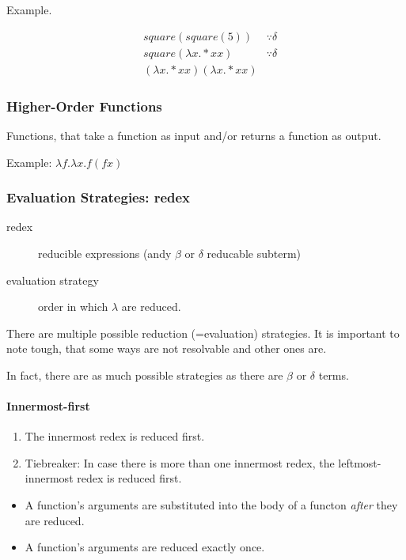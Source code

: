 Example. 

\begin{align*}
&square(square(5)) & \because \delta \\
&square(\lambda x. * x x) & \because \delta \\
& (\lambda x. * x x)(\lambda x. * x x) & 
\end{align*}

\subsubsection{Higher-Order Functions}

Functions, that take a function as input and/or returns a function as output.

Example: $\lambda f . \lambda x. f (f x)$

\subsubsection{Evaluation Strategies: redex}
\begin{description}
	\item[redex] reducible expressions (andy $\beta$ or $\delta$ reducable subterm)
	\item[evaluation strategy] order in which $\lambda$ are reduced.
\end{description}

There are multiple possible reduction (=evaluation) strategies. It is important to note tough, that some ways are not resolvable and other ones are.

In fact, there are as much possible strategies as there are $\beta$ or $\delta$ terms.

\paragraph{Innermost-first}

\begin{enumerate}
	\item The innermost redex is reduced first.
	\item Tiebreaker: In case there is more than one innermost redex, the leftmost-innermost redex is reduced first.
\end{enumerate}


\begin{itemize}
	\item A function's arguments are substituted into the body of a functon \emph{after} they are reduced.
	\item A function's arguments are reduced exactly once.
\end{itemize}

